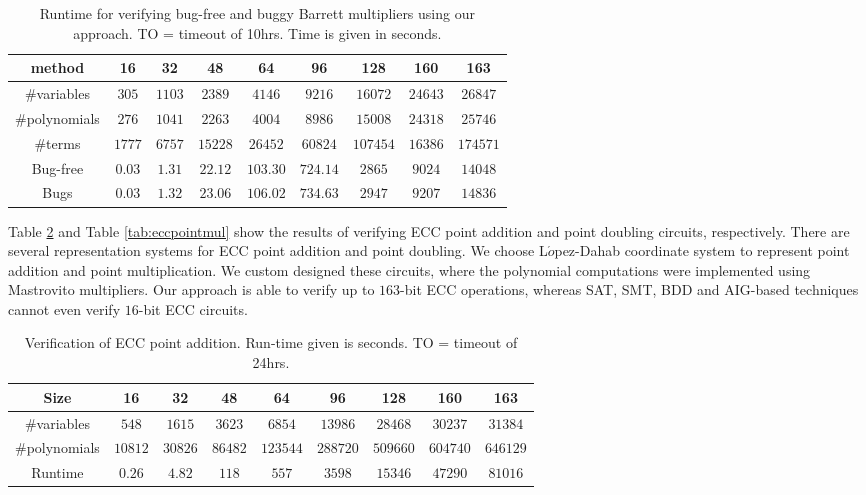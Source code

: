 \begin{table}[hbt!]
\begin{center}
\caption{ Runtime for verifying bug-free and buggy Barrett multipliers using our approach. 
TO = timeout of 10hrs. Time is given in seconds.} 
\label{tab:ourbar}
\begin{tabular}{|c||c|c|c|c|c|c|c|c|} \hline 
method & 16 & 32 & 48 & 64 & 96 & 128  &160 &163\\
\hline

\#variables &$305$ 	&$1103$ 	&$2389$ 	&$4146$ 	&$9216$ 	&$16072$ 	&$24643$ 	&$26847$ \\
\hline
\#polynomials &$276$ &$1041$ 	&$2263$ 	&$4004$ 	&$8986$ 	&$15008$ 	&$24318$ 	&$25746$ \\
\hline
\#terms &$1777$ 	&$6757$ 	&$15228$ 	&$26452$ 	&$60824$ 	&$107454$ 	&$16386$ 	&$174571$ \\
\hline
Bug-free &$0.03$ 	&$1.31$ 	&$22.12$ 	&$103.30$ 	&$724.14$ 	&$2865$ 	&$9024$ 	&$14048$ \\
\hline
Bugs & $0.03$ 		&$1.32$ 	&$23.06$ 	&$106.02$ 	&$734.63$ 	&$2947$  	&$9207$ 	&$14836$\\
\hline
\end{tabular}
\end{center}
\end{table}


Table \ref{tab:eccpointadd} and Table \ref{tab:eccpointmul} show the 
results of verifying ECC point addition and point doubling circuits,
respectively.  There are several representation systems for ECC point addition 
and point doubling. We choose L$\acute{o}$pez-Dahab coordinate 
system \cite{Lopez98} to represent point addition and point
multiplication. We custom designed these circuits, where the
polynomial computations were implemented using Mastrovito
multipliers. Our approach is able to verify up to $163$-bit ECC
operations, whereas SAT, SMT, BDD and AIG-based techniques cannot even
verify $16$-bit ECC circuits. 








\begin{table}[h!]
\begin{center}
\caption{ Verification of ECC point addition. Run-time given is
  seconds. TO = timeout of 24hrs.}   
\label{tab:eccpointadd}
\begin{tabular}{|c||c|c|c|c|c|c|c|c|} \hline 
Size & 16 & 32 & 48 & 64 & 96 & 128  &160 &163\\
\hline
\#variables &$548$ &$1615$ &$3623$ &$6854$ &$13986$ &$28468$ &$30237$ &$31384$ \\
\hline
\#polynomials &$10812$ &$30826$ &$86482$ &$123544$ &$288720$ &$509660$ &$604740$ &$646129$ \\
\hline
Runtime &$0.26$ &$4.82$ &$118$ &$557$ &$3598$ &$15346$ &$47290$ &$81016$ \\
\hline
\end{tabular}
\end{center}
\end{table}

